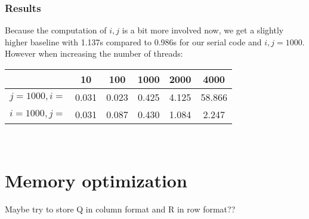 \documentclass[a4paper]{scrartcl}
\begin{document}
        \subsubsection{Results}
            Because the computation of $i,j$ is a bit more involved now, we
            get a slightly higher baseline with 1.137s compared to 0.986s
            for our serial code and $i,j=1000$. However when increasing the number of threads:\\

        \noindent\begin{tabular}{c|c|c|c|c|c}
                &10 & 100 & 1000 & 2000 & 4000\\
            \hline
            $j=1000, i=$ & 0.031 & 0.023 & 0.425 & 4.125 & 58.866 \\
            $i=1000, j=$ & 0.031 & 0.087 & 0.430 & 1.084 & 2.247\\
        \end{tabular}\\[10pt]

            


            


\section{Memory optimization}
    Maybe try to store Q in column format and R in row format??
\end{document}

